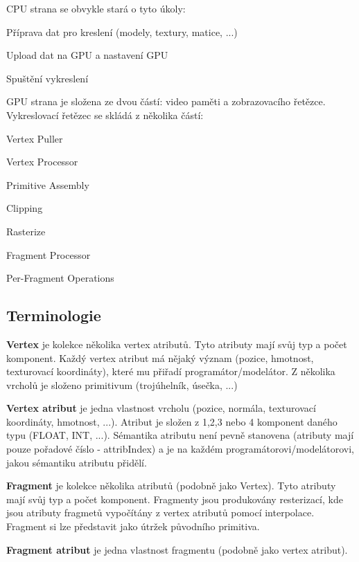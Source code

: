 C\-P\-U strana se obvykle stará o tyto úkoly\-:
\begin{DoxyItemize}
\item Příprava dat pro kreslení (modely, textury, matice, ...)
\item Upload dat na G\-P\-U a nastavení G\-P\-U
\item Spuštění vykreslení
\end{DoxyItemize}

G\-P\-U strana je složena ze dvou částí\-: video paměti a zobrazovacího řetězce. Vykreslovací řetězec se skládá z několika částí\-:
\begin{DoxyItemize}
\item Vertex Puller
\item Vertex Processor
\item Primitive Assembly
\item Clipping
\item Rasterize
\item Fragment Processor
\item Per-\/\-Fragment Operations
\end{DoxyItemize}\hypertarget{index_terminologie}{}\subsection{Terminologie}\label{index_terminologie}
{\bfseries Vertex} je kolekce několika vertex atributů. Tyto atributy mají svůj typ a počet komponent. Každý vertex atribut má nějaký význam (pozice, hmotnost, texturovací koordináty), které mu přiřadí programátor/modelátor. Z několika vrcholů je složeno primitivum (trojúhelník, úsečka, ...)

{\bfseries Vertex atribut} je jedna vlastnost vrcholu (pozice, normála, texturovací koordináty, hmotnost, ...). Atribut je složen z 1,2,3 nebo 4 komponent daného typu (F\-L\-O\-A\-T, I\-N\-T, ...). Sémantika atributu není pevně stanovena (atributy mají pouze pořadové číslo -\/ attrib\-Index) a je na každém programátorovi/modelátorovi, jakou sémantiku atributu přidělí. 

{\bfseries Fragment} je kolekce několika atributů (podobně jako Vertex). Tyto atributy mají svůj typ a počet komponent. Fragmenty jsou produkovány resterizací, kde jsou atributy fragmetů vypočítány z vertex atributů pomocí interpolace. Fragment si lze představit jako útržek původního primitiva.

{\bfseries Fragment atribut} je jedna vlastnost fragmentu (podobně jako vertex atribut).


